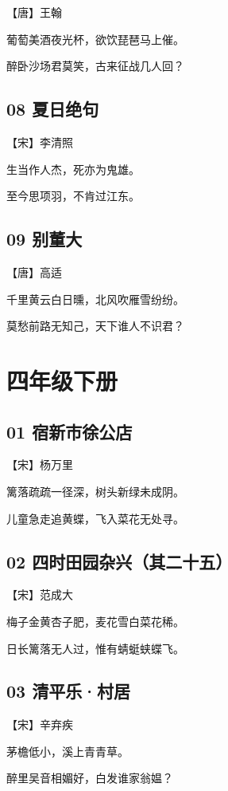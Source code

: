 \documentclass[12pt]{article}
\begin{document}
【唐】王翰

葡萄美酒夜光杯，欲饮琵琶马上催。

醉卧沙场君莫笑，古来征战几人回？

\subsection*{08 夏日绝句}

【宋】李清照

生当作人杰，死亦为鬼雄。

至今思项羽，不肯过江东。

\subsection*{09 别董大}

【唐】高适

千里黄云白日曛，北风吹雁雪纷纷。

莫愁前路无知己，天下谁人不识君？

\newpage

\section*{四年级下册}

\subsection*{01 宿新市徐公店}

【宋】杨万里

篱落疏疏一径深，树头新绿未成阴。

儿童急走追黄蝶，飞入菜花无处寻。

\subsection*{02 四时田园杂兴（其二十五）}

【宋】范成大

梅子金黄杏子肥，麦花雪白菜花稀。

日长篱落无人过，惟有蜻蜓蛱蝶飞。

\subsection*{03 清平乐·村居}

【宋】辛弃疾

茅檐低小，溪上青青草。

醉里吴音相媚好，白发谁家翁媪？ 
\end{document}
